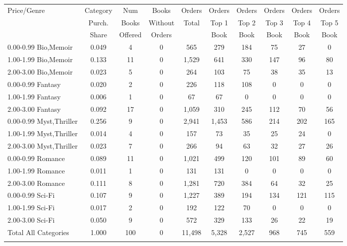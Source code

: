 \begin{center}
\begin{tabular}{lccccccccc}
\hline \noalign{\smallskip}Price/Genre & Category & Num & Books & Orders & Orders & Orders & Orders & Orders & Orders\\
 & Purch. & Books & Without & Total & Top 1 & Top 2 & Top 3 & Top 4 & Top 5\\
 & Share & Offered & Orders &  & Book & Book & Book & Book & Book\\
\noalign{\smallskip}\hline \noalign{\smallskip}0.00-0.99 Bio,Memoir & 0.049 & 4 & 0 & 565 & 279 & 184 & 75 & 27 & 0\\
1.00-1.99 Bio,Memoir & 0.133 & 11 & 0 & 1,529 & 641 & 330 & 147 & 96 & 80\\
2.00-3.00 Bio,Memoir & 0.023 & 5 & 0 & 264 & 103 & 75 & 38 & 35 & 13\\
0.00-0.99 Fantasy & 0.020 & 2 & 0 & 226 & 118 & 108 & 0 & 0 & 0\\
1.00-1.99 Fantasy & 0.006 & 1 & 0 & 67 & 67 & 0 & 0 & 0 & 0\\
2.00-3.00 Fantasy & 0.092 & 17 & 0 & 1,059 & 310 & 245 & 112 & 70 & 56\\
0.00-0.99 Myst,Thriller & 0.256 & 9 & 0 & 2,941 & 1,453 & 586 & 214 & 202 & 165\\
1.00-1.99 Myst,Thriller & 0.014 & 4 & 0 & 157 & 73 & 35 & 25 & 24 & 0\\
2.00-3.00 Myst,Thriller & 0.023 & 7 & 0 & 266 & 94 & 63 & 32 & 27 & 26\\
0.00-0.99 Romance & 0.089 & 11 & 0 & 1,021 & 499 & 120 & 101 & 89 & 60\\
1.00-1.99 Romance & 0.011 & 1 & 0 & 131 & 131 & 0 & 0 & 0 & 0\\
2.00-3.00 Romance & 0.111 & 8 & 0 & 1,281 & 720 & 384 & 64 & 32 & 25\\
0.00-0.99 Sci-Fi & 0.107 & 9 & 0 & 1,227 & 389 & 194 & 134 & 121 & 115\\
1.00-1.99 Sci-Fi & 0.017 & 2 & 0 & 192 & 122 & 70 & 0 & 0 & 0\\
2.00-3.00 Sci-Fi & 0.050 & 9 & 0 & 572 & 329 & 133 & 26 & 22 & 19\\
\hline Total All Categories & 1.000 & 100 & 0 & 11,498 & 5,328 & 2,527 & 968 & 745 & 559\\
\noalign{\smallskip}\hline\end{tabular}\\
\end{center}
